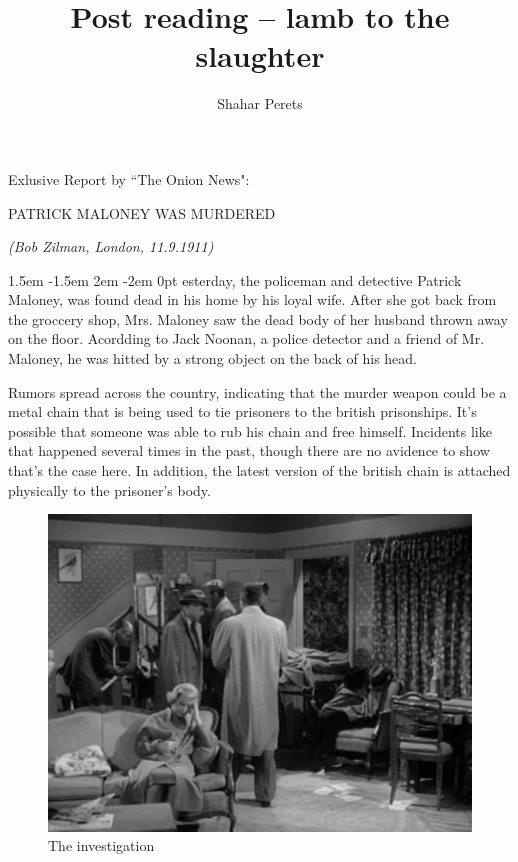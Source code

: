 \documentclass[]{article}
\author{Shahar Perets}
\title{\vspace{-40px}Post reading -- lamb to the slaughter}
\def\pstart#1{\noindent\smash{\lower3ex\hbox{\llap{\Huge\frakfamily#1}}}
	\parshape=3 1.5em \dimexpr\hsize-1.5em 2em \dimexpr\hsize-2em 0pt \hsize}
\begin{document}
	
	\maketitle
	
	\vfill
		
	\hfil \large Exlusive Report by ``The Onion News": \hfil
	
	\hfil \Large \MakeUppercase{Patrick Maloney was murdered} \normalsize \hfil 
	
	\vspace{2pt}
	\noindent \textit{(Bob Zilman, London, 11.9.1911)}
	\vspace{-8pt}
	
	\begin{multicols}{2}
		\noindent \pstart{Y}esterday, the policeman and detective Patrick Maloney, was found dead in his home by his loyal wife. After she got back from the groccery shop, Mrs. Maloney saw the dead body of her husband thrown away on the floor. Acordding to Jack Noonan, a police detector and a friend of Mr. Maloney, he was hitted by a strong object on the back of his head.
		
		Rumors spread across the country, indicating that the murder weapon could be a metal chain that is being used to tie prisoners to the british prisonships. It's possible that someone was able to rub his chain and free himself. Incidents like that happened several times in the past, though there are no avidence to show that's the case here. In addition, the latest version of the british chain is attached physically to the prisoner's body. 
		
		\begin{figure}
			\includegraphics[scale=0.23]{capturfiles_264.jpg}
			\caption[]{The investigation}
		\end{figure}
		

\end{multicols}
\end{document}
